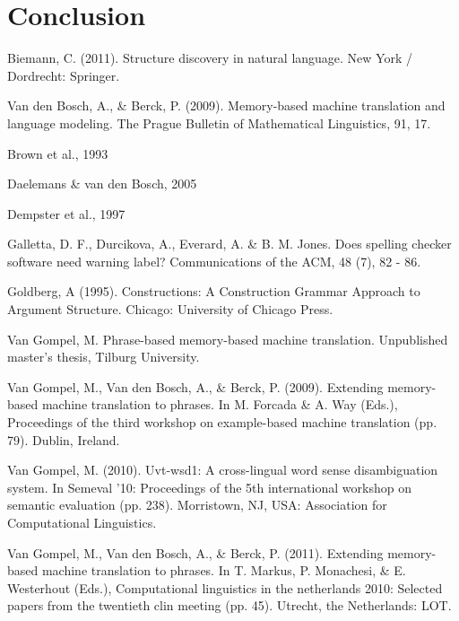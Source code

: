 \documentclass[12pt]{article}
\begin{document}
\section{Conclusion}

\begin{thebibliography}{99}

Biemann, C. (2011). Structure discovery in natural language. New York / Dordrecht: Springer.

Van den Bosch, A., \& Berck, P. (2009). Memory-based machine translation and language
modeling. The Prague Bulletin of Mathematical Linguistics, 91, 17.

Brown et al., 1993

Daelemans \& van den Bosch, 2005

Dempster et al., 1997

Galletta, D. F., Durcikova, A., Everard, A. \& B. M. Jones. Does spelling checker software need warning label? Communications of the ACM, 48 (7), 82 - 86.

Goldberg, A (1995). Constructions: A Construction Grammar Approach to Argument Structure. Chicago: University of Chicago Press.

Van Gompel, M. Phrase-based memory-based machine translation. Unpublished
master's thesis, Tilburg University.

Van Gompel, M., Van den Bosch, A., \& Berck, P. (2009). Extending memory-based
machine translation to phrases. In M. Forcada \& A. Way (Eds.), Proceedings of the
third workshop on example-based machine translation (pp. 79). Dublin, Ireland.

Van Gompel, M. (2010). Uvt-wsd1: A cross-lingual word sense disambiguation system.
In Semeval '10: Proceedings of the 5th international workshop on semantic evaluation
(pp. 238). Morristown, NJ, USA: Association for Computational Linguistics.

Van Gompel, M., Van den Bosch, A., \& Berck, P. (2011). Extending memory-based
machine translation to phrases. In T. Markus, P. Monachesi, \& E. Westerhout (Eds.),
Computational linguistics in the netherlands 2010: Selected papers from the twentieth
clin meeting (pp. 45). Utrecht, the Netherlands: LOT.


\end{thebibliography}
\end{document}
